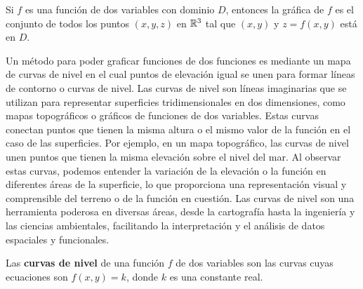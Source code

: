 \begin{definition}
    Si $f$ es una función de dos variables con dominio $D$, entonces la gráfica de $f$ es el conjunto de todos los puntos $(x, y, z)$ en $\RR[3]$ tal que $(x, y)$ y $z = f(x, y)$ está en $D$.
\end{definition}

Un método para poder graficar funciones de dos funciones es mediante un mapa de curvas de nivel en el cual puntos de elevación igual se unen para formar líneas de contorno o curvas de nivel. Las curvas de nivel son líneas imaginarias que se utilizan para representar superficies tridimensionales en dos dimensiones, como mapas topográficos o gráficos de funciones de dos variables. Estas curvas conectan puntos que tienen la misma altura o el mismo valor de la función en el caso de las superficies. Por ejemplo, en un mapa topográfico, las curvas de nivel unen puntos que tienen la misma elevación sobre el nivel del mar. Al observar estas curvas, podemos entender la variación de la elevación o la función en diferentes áreas de la superficie, lo que proporciona una representación visual y comprensible del terreno o de la función en cuestión. Las curvas de nivel son una herramienta poderosa en diversas áreas, desde la cartografía hasta la ingeniería y las ciencias ambientales, facilitando la interpretación y el análisis de datos espaciales y funcionales.

\begin{definition}
    Las \textbf{curvas de nivel} de una función $f$ de dos variables son las curvas cuyas ecuaciones son $f(x, y) = k$, donde $k$ es una constante real.
\end{definition}